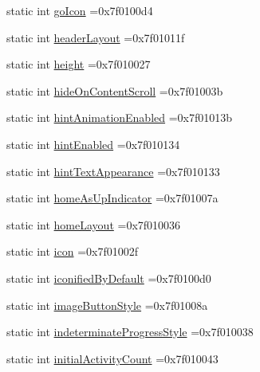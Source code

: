 \begin{DoxyCompactItemize}
\item 
static int \hyperlink{classandroid_1_1support_1_1design_1_1R_1_1attr_afe5121a9441846953200d55ba44308e6}{go\+Icon} =0x7f0100d4
\item 
static int \hyperlink{classandroid_1_1support_1_1design_1_1R_1_1attr_a49a77c4653b1f3d4066e9f8f6fe5cb65}{header\+Layout} =0x7f01011f
\item 
static int \hyperlink{classandroid_1_1support_1_1design_1_1R_1_1attr_a9f0ba1ff755eae97d0aaf956a1f3438b}{height} =0x7f010027
\item 
static int \hyperlink{classandroid_1_1support_1_1design_1_1R_1_1attr_a3a471e653f9beeccab7aa3f54464f4ab}{hide\+On\+Content\+Scroll} =0x7f01003b
\item 
static int \hyperlink{classandroid_1_1support_1_1design_1_1R_1_1attr_a86d721c110a9ef2a63cf3b2d16ad9a50}{hint\+Animation\+Enabled} =0x7f01013b
\item 
static int \hyperlink{classandroid_1_1support_1_1design_1_1R_1_1attr_afd69514a0f20d586a6ecea123884303c}{hint\+Enabled} =0x7f010134
\item 
static int \hyperlink{classandroid_1_1support_1_1design_1_1R_1_1attr_a8c3c8800b2a920626f8ebd3de5dd34b3}{hint\+Text\+Appearance} =0x7f010133
\item 
static int \hyperlink{classandroid_1_1support_1_1design_1_1R_1_1attr_acd12fadab5fd0cefc308b364fc46c135}{home\+As\+Up\+Indicator} =0x7f01007a
\item 
static int \hyperlink{classandroid_1_1support_1_1design_1_1R_1_1attr_a4e4911b093d74cb70c4440363410110e}{home\+Layout} =0x7f010036
\item 
static int \hyperlink{classandroid_1_1support_1_1design_1_1R_1_1attr_a4f038778976a3c5a21ca334ebe58357d}{icon} =0x7f01002f
\item 
static int \hyperlink{classandroid_1_1support_1_1design_1_1R_1_1attr_a6e1cf27cdba92453a20269f73165859b}{iconified\+By\+Default} =0x7f0100d0
\item 
static int \hyperlink{classandroid_1_1support_1_1design_1_1R_1_1attr_ad5ae07572c9491c79516688983b64fab}{image\+Button\+Style} =0x7f01008a
\item 
static int \hyperlink{classandroid_1_1support_1_1design_1_1R_1_1attr_a8b45873d94fc96a0aa003380408c6b79}{indeterminate\+Progress\+Style} =0x7f010038
\item 
static int \hyperlink{classandroid_1_1support_1_1design_1_1R_1_1attr_a169175309f22c90214d396ce178fe3dc}{initial\+Activity\+Count} =0x7f010043
\item 

\end{DoxyCompactItemize}
